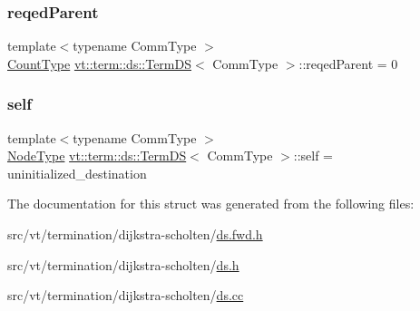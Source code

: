 \mbox{\label{structvt_1_1term_1_1ds_1_1_term_d_s_af2aced5d22eef80e3e4d1cf761f52693}} 
\subsubsection{\texorpdfstring{reqed\+Parent}{reqedParent}}
{\footnotesize\ttfamily template$<$typename Comm\+Type $>$ \\
\hyperlink{structvt_1_1term_1_1ds_1_1_term_d_s_a54f4ebd7e1ecb59c32c0f5b03ef9f20b}{Count\+Type} \hyperlink{structvt_1_1term_1_1ds_1_1_term_d_s}{vt\+::term\+::ds\+::\+Term\+DS}$<$ Comm\+Type $>$\+::reqed\+Parent = 0\hspace{0.3cm}{\ttfamily [protected]}}

\mbox{\label{structvt_1_1term_1_1ds_1_1_term_d_s_adadcd6e130836bc8d8a6819797f6900b}} 
\subsubsection{\texorpdfstring{self}{self}}
{\footnotesize\ttfamily template$<$typename Comm\+Type $>$ \\
\hyperlink{namespacevt_a866da9d0efc19c0a1ce79e9e492f47e2}{Node\+Type} \hyperlink{structvt_1_1term_1_1ds_1_1_term_d_s}{vt\+::term\+::ds\+::\+Term\+DS}$<$ Comm\+Type $>$\+::self = uninitialized\+\_\+destination\hspace{0.3cm}{\ttfamily [protected]}}



The documentation for this struct was generated from the following files\+:\begin{DoxyCompactItemize}
\item 
src/vt/termination/dijkstra-\/scholten/\hyperlink{ds_8fwd_8h}{ds.\+fwd.\+h}\item 
src/vt/termination/dijkstra-\/scholten/\hyperlink{ds_8h}{ds.\+h}\item 
src/vt/termination/dijkstra-\/scholten/\hyperlink{ds_8cc}{ds.\+cc}\end{DoxyCompactItemize}
